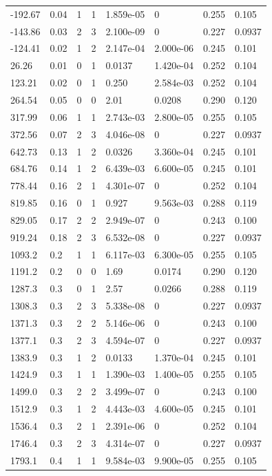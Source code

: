 \documentclass[preview]{standalone}
\begin{document}
{{\begin{tabular}{L{1.2cm}C{1.2cm} C{0.3cm}C{0.5cm} C{1.4cm}C{1.4cm} C{1.4cm}C{1.4cm}}
  -192.67  &  0.04  & 1     &  1 &  1.859e-05  & 0  & 0.255 &  0.105   \\ 
  -143.86  &  0.03  & 2     &  3 &  2.100e-09  & 0  & 0.227 &  0.0937   \\ 
  -124.41  &  0.02  & 1     &  2 &  2.147e-04  & 2.000e-06  & 0.245 &  0.101   \\ 
  26.26  &  0.01  & 0     &  1 &  0.0137  & 1.420e-04  & 0.252 &  0.104   \\ 
  123.21  &  0.02  & 0     &  1 &  0.250  & 2.584e-03  & 0.252 &  0.104   \\ 
  264.54  &  0.05  & 0     &  0 &  2.01  & 0.0208  & 0.290 &  0.120   \\ 
  317.99  &  0.06  & 1     &  1 &  2.743e-03  & 2.800e-05  & 0.255 &  0.105   \\ 
  372.56  &  0.07  & 2     &  3 &  4.046e-08  & 0  & 0.227 &  0.0937   \\ 
  642.73  &  0.13  & 1     &  2 &  0.0326  & 3.360e-04  & 0.245 &  0.101   \\ 
  684.76  &  0.14  & 1     &  2 &  6.439e-03  & 6.600e-05  & 0.245 &  0.101   \\ 
  778.44  &  0.16  & 2     &  1 &  4.301e-07  & 0  & 0.252 &  0.104   \\ 
  819.85  &  0.16  & 0     &  1 &  0.927  & 9.563e-03  & 0.288 &  0.119   \\ 
  829.05  &  0.17  & 2     &  2 &  2.949e-07  & 0  & 0.243 &  0.100   \\ 
  919.24  &  0.18  & 2     &  3 &  6.532e-08  & 0  & 0.227 &  0.0937   \\ 
  1093.2  &   0.2  & 1     &  1 &  6.117e-03  & 6.300e-05  & 0.255 &  0.105   \\ 
  1191.2  &   0.2  & 0     &  0 &  1.69  & 0.0174  & 0.290 &  0.120   \\ 
  1287.3  &   0.3  & 0     &  1 &  2.57  & 0.0266  & 0.288 &  0.119   \\ 
  1308.3  &   0.3  & 2     &  3 &  5.338e-08  & 0  & 0.227 &  0.0937   \\ 
  1371.3  &   0.3  & 2     &  2 &  5.146e-06  & 0  & 0.243 &  0.100   \\ 
  1377.1  &   0.3  & 2     &  3 &  4.594e-07  & 0  & 0.227 &  0.0937   \\ 
  1383.9  &   0.3  & 1     &  2 &  0.0133  & 1.370e-04  & 0.245 &  0.101   \\ 
  1424.9  &   0.3  & 1     &  1 &  1.390e-03  & 1.400e-05  & 0.255 &  0.105   \\ 
  1499.0  &   0.3  & 2     &  2 &  3.499e-07  & 0  & 0.243 &  0.100   \\ 
  1512.9  &   0.3  & 1     &  2 &  4.443e-03  & 4.600e-05  & 0.245 &  0.101   \\ 
  1536.4  &   0.3  & 2     &  1 &  2.391e-06  & 0  & 0.252 &  0.104   \\ 
  1746.4  &   0.3  & 2     &  3 &  4.314e-07  & 0  & 0.227 &  0.0937   \\ 
  1793.1  &   0.4  & 1     &  1 &  9.584e-03  & 9.900e-05  & 0.255 &  0.105   \\ 
\hline 
\end{tabular} 

}}
\end{document}
